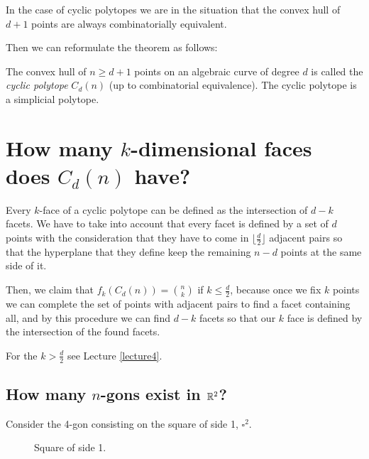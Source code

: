 In the case of cyclic polytopes we are in the situation that the convex hull of $d+1$ points are always combinatorially equivalent.

Then we can reformulate the theorem as follows:

\begin{theorem}
The convex hull of $n\geq d+1$ points on an algebraic curve of degree $d$ is called the \emph{cyclic polytope} $C_d(n)$ (up to combinatorial equivalence). The cyclic polytope is a simplicial polytope.
\end{theorem}

\section{How many $k$-dimensional faces does $C_d(n)$ have?}

Every $k$-face of a cyclic polytope can be defined as the intersection of $d-k$ facets. We have to take into account that every facet is defined by a set of $d$ points with the consideration that they have to come in $\lfloor \frac{d}{2} \rfloor$ adjacent pairs so that the hyperplane that they define keep the remaining $n-d$ points at the same side of it.

Then, we claim that $f_k(C_d(n)) = \binom{n}{k}$ if $k\leq \frac{d}{2}$, because once we fix $k$ points we can complete the set of points with adjacent pairs to find a facet containing all, and by this procedure we can find $d-k$ facets so that our $k$ face is defined by the intersection of the found facets.

For the $k > \frac{d}{2}$ see Lecture \ref{lecture4}.

\subsection{How many $n$-gons exist in $\mathbb{R}^2$?}

Consider the 4-gon consisting on the square of side 1, $\square ^2$.

\begin{figure}[h]
\caption{Square of side 1.}
\end{figure}


